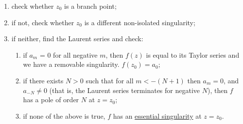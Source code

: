 \documentclass[../Main.tex]{subfiles}
\begin{document}
\begin{enumerate}
    \item check whether $z_0$ is a branch point;
    \item if not, check whether $z_0$ is a different non-isolated singularity;
    \item if neither, find the Laurent series and check:
    \begin{enumerate}
        \item if $a_m$ = 0 for all negative $m$, then $f(z)$ is equal to its Taylor series and we have a removable singularity. $f(z_0) = a_0$;
        \item if there exists $N > 0$ such that for all $m < -(N+1)$ then $a_m = 0$, and $a_{-N} \neq 0$ (that is, the Laurent series terminates for negative $N$), then $f$ has a pole of order $N$ at $z = z_0$;
        \item if none of the above is true, $f$ has an \underline{essential singularity} at $z = z_0$.
    \end{enumerate}
\end{enumerate}
\end{document}
